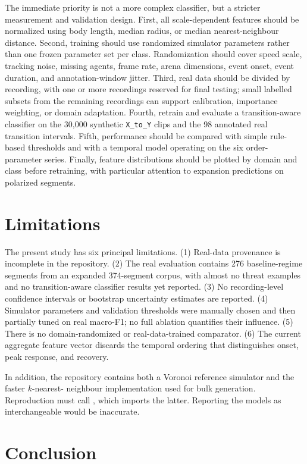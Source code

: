 \documentclass[11pt]{article}
\begin{document}
The immediate priority is not a more complex classifier, but a stricter measurement and validation
design. First, all scale-dependent features should be normalized using body length, median radius, or
median nearest-neighbour distance. Second, training should use randomized simulator parameters rather
than one frozen parameter set per class. Randomization should cover speed scale, tracking noise, missing
agents, frame rate, arena dimensions, event onset, event duration, and annotation-window jitter.
Third, real data should be divided by recording, with one or more recordings reserved for final testing;
small labelled subsets from the remaining recordings can support calibration, importance weighting, or
domain adaptation. Fourth, retrain and evaluate a transition-aware classifier on the 30{,}000 synthetic
\texttt{X\_to\_Y} clips and the 98 annotated real transition intervals. Fifth, performance should be
compared with simple rule-based thresholds and with a temporal model operating on the six order-parameter
series. Finally, feature distributions should be plotted by domain and class before retraining, with
particular attention to expansion predictions on polarized segments.

\section{Limitations}

The present study has six principal limitations. (1) Real-data provenance is incomplete in the
repository. (2) The real evaluation contains 276 baseline-regime segments from an expanded 374-segment
corpus, with almost no threat examples and no transition-aware classifier results yet reported. (3) No
recording-level confidence intervals or bootstrap uncertainty estimates are reported. (4) Simulator
parameters and validation thresholds were manually chosen and then partially tuned on real macro-F1; no
full ablation quantifies their influence. (5) There is no domain-randomized or real-data-trained
comparator. (6) The current aggregate feature vector discards the temporal ordering that distinguishes
onset, peak response, and recovery.

In addition, the repository contains both a Voronoi reference simulator and the faster \(k\)-nearest-
neighbour implementation used for bulk generation. Reproduction must call
, which imports the latter. Reporting the models as interchangeable
would be inaccurate.

\section{Conclusion}
\end{document}
